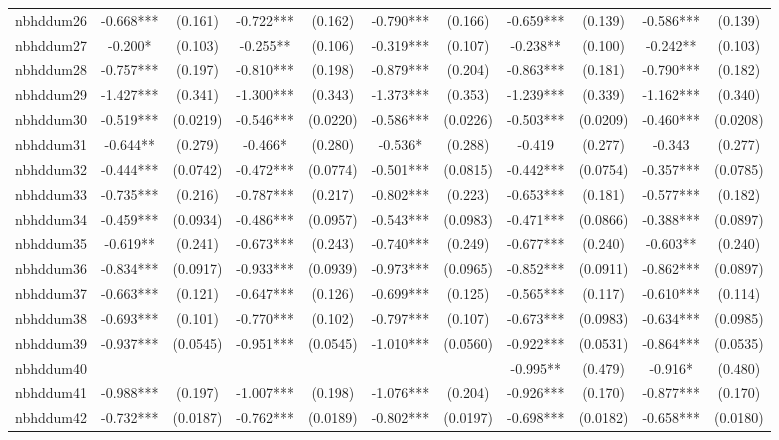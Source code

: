 \documentclass[]{article}
\begin{document}
\begin{tabular}{lcccccccccc}
nbhddum26 & -0.668*** & (0.161) & -0.722*** & (0.162) & -0.790*** & (0.166) & -0.659*** & (0.139) & -0.586*** & (0.139) \\
nbhddum27 & -0.200* & (0.103) & -0.255** & (0.106) & -0.319*** & (0.107) & -0.238** & (0.100) & -0.242** & (0.103) \\
nbhddum28 & -0.757*** & (0.197) & -0.810*** & (0.198) & -0.879*** & (0.204) & -0.863*** & (0.181) & -0.790*** & (0.182) \\
nbhddum29 & -1.427*** & (0.341) & -1.300*** & (0.343) & -1.373*** & (0.353) & -1.239*** & (0.339) & -1.162*** & (0.340) \\
nbhddum30 & -0.519*** & (0.0219) & -0.546*** & (0.0220) & -0.586*** & (0.0226) & -0.503*** & (0.0209) & -0.460*** & (0.0208) \\
nbhddum31 & -0.644** & (0.279) & -0.466* & (0.280) & -0.536* & (0.288) & -0.419 & (0.277) & -0.343 & (0.277) \\
nbhddum32 & -0.444*** & (0.0742) & -0.472*** & (0.0774) & -0.501*** & (0.0815) & -0.442*** & (0.0754) & -0.357*** & (0.0785) \\
nbhddum33 & -0.735*** & (0.216) & -0.787*** & (0.217) & -0.802*** & (0.223) & -0.653*** & (0.181) & -0.577*** & (0.182) \\
nbhddum34 & -0.459*** & (0.0934) & -0.486*** & (0.0957) & -0.543*** & (0.0983) & -0.471*** & (0.0866) & -0.388*** & (0.0897) \\
nbhddum35 & -0.619** & (0.241) & -0.673*** & (0.243) & -0.740*** & (0.249) & -0.677*** & (0.240) & -0.603** & (0.240) \\
nbhddum36 & -0.834*** & (0.0917) & -0.933*** & (0.0939) & -0.973*** & (0.0965) & -0.852*** & (0.0911) & -0.862*** & (0.0897) \\
nbhddum37 & -0.663*** & (0.121) & -0.647*** & (0.126) & -0.699*** & (0.125) & -0.565*** & (0.117) & -0.610*** & (0.114) \\
nbhddum38 & -0.693*** & (0.101) & -0.770*** & (0.102) & -0.797*** & (0.107) & -0.673*** & (0.0983) & -0.634*** & (0.0985) \\
nbhddum39 & -0.937*** & (0.0545) & -0.951*** & (0.0545) & -1.010*** & (0.0560) & -0.922*** & (0.0531) & -0.864*** & (0.0535) \\
nbhddum40 &  &  &  &  &  &  & -0.995** & (0.479) & -0.916* & (0.480) \\
nbhddum41 & -0.988*** & (0.197) & -1.007*** & (0.198) & -1.076*** & (0.204) & -0.926*** & (0.170) & -0.877*** & (0.170) \\
nbhddum42 & -0.732*** & (0.0187) & -0.762*** & (0.0189) & -0.802*** & (0.0197) & -0.698*** & (0.0182) & -0.658*** & (0.0180) \\

\end{tabular}
\end{document}
